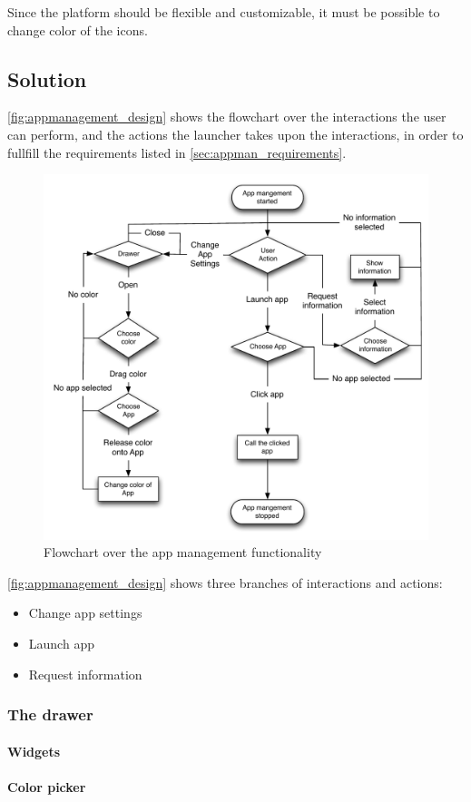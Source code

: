 Since the \giraf[] platform should be flexible and customizable, it must be possible to change color of the \giraf[] icons.

\subsection{Solution}
\label{sec:appman_solution}

\autoref{fig:appmanagement_design} shows the flowchart over the interactions the user can perform, and the actions the launcher takes upon the interactions, in order to fullfill the requirements listed in \autoref{sec:appman_requirements}.

\begin{figure}[h]
	\centering
	\includegraphics[width=1\textwidth]{gfx/appmanagement.pdf}
	\caption{Flowchart over the app management functionality}
	\label{fig:appmanagement_design}
\end{figure}

\autoref{fig:appmanagement_design} shows three branches of interactions and actions:

\begin{itemize}
	\item Change app settings
	\item Launch app
	\item Request information
\end{itemize}






\subsubsection{The drawer}
\label{sec:drawer}
\paragraph{Widgets}
\label{par:widgets}
\paragraph{Color picker}
\label{par:colorpicker}